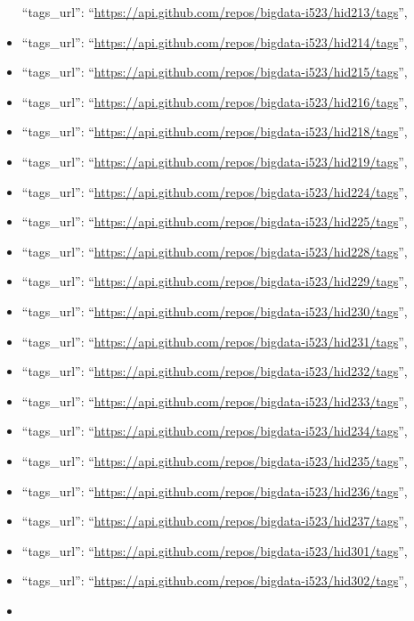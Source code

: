 \begin{itemize}
  ``tags\_url'':
  ``\url{https://api.github.com/repos/bigdata-i523/hid213/tags}'',
\item
  ``tags\_url'':
  ``\url{https://api.github.com/repos/bigdata-i523/hid214/tags}'',
\item
  ``tags\_url'':
  ``\url{https://api.github.com/repos/bigdata-i523/hid215/tags}'',
\item
  ``tags\_url'':
  ``\url{https://api.github.com/repos/bigdata-i523/hid216/tags}'',
\item
  ``tags\_url'':
  ``\url{https://api.github.com/repos/bigdata-i523/hid218/tags}'',
\item
  ``tags\_url'':
  ``\url{https://api.github.com/repos/bigdata-i523/hid219/tags}'',
\item
  ``tags\_url'':
  ``\url{https://api.github.com/repos/bigdata-i523/hid224/tags}'',
\item
  ``tags\_url'':
  ``\url{https://api.github.com/repos/bigdata-i523/hid225/tags}'',
\item
  ``tags\_url'':
  ``\url{https://api.github.com/repos/bigdata-i523/hid228/tags}'',
\item
  ``tags\_url'':
  ``\url{https://api.github.com/repos/bigdata-i523/hid229/tags}'',
\item
  ``tags\_url'':
  ``\url{https://api.github.com/repos/bigdata-i523/hid230/tags}'',
\item
  ``tags\_url'':
  ``\url{https://api.github.com/repos/bigdata-i523/hid231/tags}'',
\item
  ``tags\_url'':
  ``\url{https://api.github.com/repos/bigdata-i523/hid232/tags}'',
\item
  ``tags\_url'':
  ``\url{https://api.github.com/repos/bigdata-i523/hid233/tags}'',
\item
  ``tags\_url'':
  ``\url{https://api.github.com/repos/bigdata-i523/hid234/tags}'',
\item
  ``tags\_url'':
  ``\url{https://api.github.com/repos/bigdata-i523/hid235/tags}'',
\item
  ``tags\_url'':
  ``\url{https://api.github.com/repos/bigdata-i523/hid236/tags}'',
\item
  ``tags\_url'':
  ``\url{https://api.github.com/repos/bigdata-i523/hid237/tags}'',
\item
  ``tags\_url'':
  ``\url{https://api.github.com/repos/bigdata-i523/hid301/tags}'',
\item
  ``tags\_url'':
  ``\url{https://api.github.com/repos/bigdata-i523/hid302/tags}'',
\item

\end{itemize}
